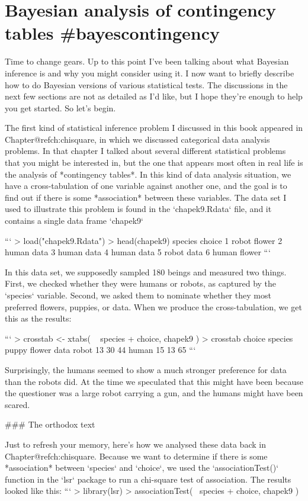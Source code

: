 \section{Bayesian analysis of contingency tables {#bayescontingency}}



Time to change gears. Up to this point I've been talking about what Bayesian inference is and why you might consider using it. I now want to briefly describe how to do Bayesian versions of various statistical tests. The discussions in the next few sections are not as detailed as I'd like, but I hope they're enough to help you get started. So let's begin.

The first kind of statistical inference problem I discussed in this book appeared in Chapter@refch:chisquare, in which we discussed categorical data analysis problems. In that chapter I talked about several different statistical problems that you might be interested in, but the one that appears most often in real life is the analysis of  *contingency tables*. In this kind of data analysis situation, we have a cross-tabulation of one variable against another one, and the goal is to find out if there is some *association* between these variables. The data set I used to illustrate this problem is found in the `chapek9.Rdata` file, and it contains a single data frame `chapek9`

```
> load("chapek9.Rdata")
> head(chapek9)
  species choice
1   robot flower
2   human   data
3   human   data
4   human   data
5   robot   data
6   human flower
```

In this data set, we supposedly sampled 180 beings and measured two things. First, we checked whether they were humans or robots, as captured by the `species` variable. Second, we asked them to nominate whether they most preferred flowers, puppies, or data. When we produce the cross-tabulation, we get this as the results:

```
> crosstab <- xtabs( ~ species + choice, chapek9 )
> crosstab
       choice
species puppy flower data
  robot    13     30   44
  human    15     13   65
```


Surprisingly, the humans seemed to show a much stronger preference for data than the robots did. At the time we speculated that this might have been because the questioner was a large robot carrying a gun, and the humans might have been scared. 

### The orthodox text

Just to refresh your memory, here's how we analysed these data back in Chapter@refch:chisquare. Because we want to determine if there is some *association* between `species` and `choice`, we used the `associationTest()` function in the `lsr` package to run a chi-square test of association. The results looked like this:
```
> library(lsr)
> associationTest( ~species + choice, chapek9 )

